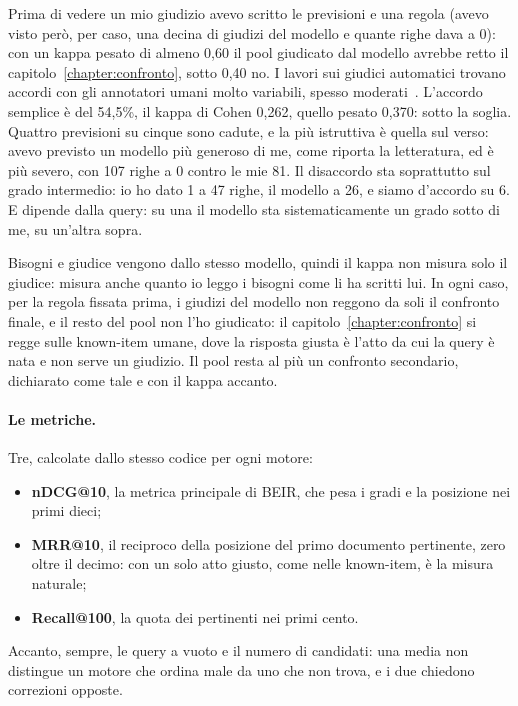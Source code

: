 Prima di vedere un mio giudizio avevo scritto le previsioni e una regola (avevo
visto però, per caso, una decina di giudizi del modello e quante righe dava a 0):
con un kappa pesato di almeno 0,60 il pool giudicato dal modello avrebbe retto
il capitolo~\ref{chapter:confronto}, sotto 0,40 no. I lavori sui giudici
automatici trovano accordi con gli annotatori umani molto variabili, spesso
moderati~\cite{thomas2023llm,faggioli2023perspectives}. L'accordo semplice è
del 54,5\%, il kappa di Cohen 0,262, quello pesato 0,370: sotto la soglia.
Quattro previsioni su cinque sono cadute, e la più istruttiva è quella sul
verso: avevo previsto un modello più generoso di me, come riporta la
letteratura, ed è più severo, con 107 righe a 0 contro le mie 81. Il
disaccordo sta soprattutto sul grado intermedio: io ho dato 1 a 47 righe, il
modello a 26, e siamo d'accordo su 6. E dipende dalla query: su una il
modello sta sistematicamente un grado sotto di me, su un'altra sopra.

Bisogni e giudice vengono dallo stesso modello, quindi il kappa non misura
solo il giudice: misura anche quanto io leggo i bisogni come li ha scritti
lui. In ogni caso, per la regola fissata prima, i giudizi del modello non
reggono da soli il confronto finale, e il resto del pool non l'ho giudicato:
il capitolo~\ref{chapter:confronto} si regge sulle known-item umane, dove la
risposta giusta è l'atto da cui la query è nata e non serve un giudizio. Il
pool resta al più un confronto secondario, dichiarato come tale e con il kappa
accanto.

\paragraph{Le metriche.} Tre, calcolate dallo stesso codice per ogni motore:
\begin{itemize}
  \item \textbf{nDCG@10}, la metrica principale di BEIR, che pesa i gradi e la
        posizione nei primi dieci;
  \item \textbf{MRR@10}, il reciproco della posizione del primo documento
        pertinente, zero oltre il decimo: con un solo atto giusto, come nelle
        known-item, è la misura naturale;
  \item \textbf{Recall@100}, la quota dei pertinenti nei primi cento.
\end{itemize}
Accanto, sempre, le query a vuoto e il numero di candidati: una media non
distingue un motore che ordina male da uno che non trova, e i due chiedono
correzioni opposte.

